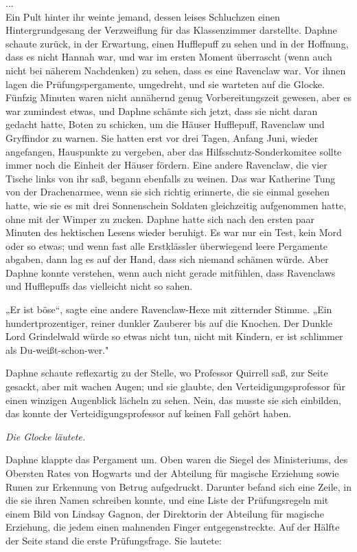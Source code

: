 {...\\ Ein Pult hinter ihr weinte jemand, dessen leises Schluchzen einen Hintergrundgesang der Verzweiflung für das Klassenzimmer darstellte. Daphne schaute zurück, in der Erwartung, einen Hufflepuff zu sehen und in der Hoffnung, dass es nicht Hannah war, und war im ersten Moment überrascht (wenn auch nicht bei näherem Nachdenken) zu sehen, dass es eine Ravenclaw war. Vor ihnen lagen die Prüfungspergamente, umgedreht, und sie warteten auf die Glocke. Fünfzig Minuten waren nicht annähernd genug Vorbereitungszeit gewesen, aber es war zumindest etwas, und Daphne schämte sich jetzt, dass sie nicht daran gedacht hatte, Boten zu schicken, um die Häuser Hufflepuff, Ravenclaw und Gryffindor zu warnen. Sie hatten erst vor drei Tagen, Anfang Juni, wieder angefangen, Hauspunkte zu vergeben, aber das Hilfsschutz-Sonderkomitee sollte immer noch die Einheit der Häuser fördern. Eine andere Ravenclaw, die vier Tische links von ihr saß, begann ebenfalls zu weinen. Das war Katherine Tung von der Drachenarmee, wenn sie sich richtig erinnerte, die sie einmal gesehen hatte, wie sie es mit drei Sonnenschein Soldaten gleichzeitig aufgenommen hatte, ohne mit der Wimper zu zucken. Daphne hatte sich nach den ersten paar Minuten des hektischen Lesens wieder beruhigt. Es war nur ein Test, kein Mord oder so etwas; und wenn fast alle Erstklässler überwiegend leere Pergamente abgaben, dann lag es auf der Hand, dass sich niemand schämen würde. Aber Daphne konnte verstehen, wenn auch nicht gerade mitfühlen, dass Ravenclaws und Hufflepuffs das vielleicht nicht so sahen.

„Er ist böse“, sagte eine andere Ravenclaw-Hexe mit zitternder Stimme. „Ein hundertprozentiger, reiner dunkler Zauberer bis auf die Knochen. Der Dunkle Lord Grindelwald würde so etwas nicht tun, nicht mit Kindern, er ist schlimmer als Du-weißt-schon-wer."

Daphne schaute reflexartig zu der Stelle, wo Professor Quirrell saß, zur Seite gesackt, aber mit wachen Augen; und sie glaubte, den Verteidigungsprofessor für einen winzigen Augenblick lächeln zu sehen. Nein, das musste sie sich einbilden, das konnte der Verteidigungsprofessor auf keinen Fall gehört haben.

\emph{Die Glocke läutete.}

Daphne klappte das Pergament um. Oben waren die Siegel des Ministeriums, des Obersten Rates von Hogwarts und der Abteilung für magische Erziehung sowie Runen zur Erkennung von Betrug aufgedruckt. Darunter befand sich eine Zeile, in die sie ihren Namen schreiben konnte, und eine Liste der Prüfungsregeln mit einem Bild von Lindsay Gagnon, der Direktorin der Abteilung für magische Erziehung, die jedem einen mahnenden Finger entgegenstreckte. Auf der Hälfte der Seite stand die erste Prüfungsfrage. Sie lautete:

}
